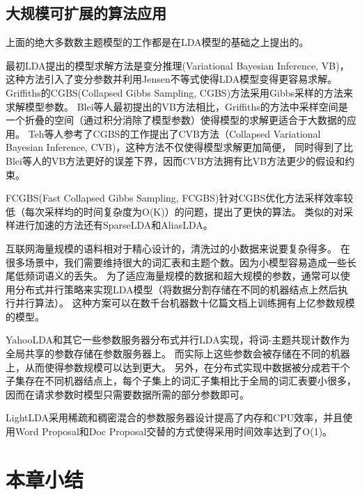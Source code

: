 \subsection{大规模可扩展的算法应用}
上面的绝大多数数主题模型的工作都是在LDA模型的基础之上提出的。

最初LDA\cite{blei2003latent}提出的模型求解方法是变分推理(Variational Bayesian Inference, VB)\cite{jordan1999an}，
这种方法引入了变分参数并利用Jensen不等式使得LDA模型变得更容易求解。
Griffiths\cite{griffiths2004finding}的CGBS(Collapsed Gibbs Sampling, CGBS)方法采用Gibbs采样的方法来求解模型参数。
Blei等人最初提出的VB方法相比，Griffiths的方法中采样空间是一个折叠的空间（通过积分消除了模型参数）使得模型的求解更适合于大数据的应用。
Teh\cite{teh2006a}等人参考了CGBS的工作提出了CVB方法（Collapsed Variational Bayesian Inference, CVB)，这种方法不仅使得模型求解更加简便，
同时得到了比Blei等人的VB方法更好的误差下界，因而CVB方法拥有比VB方法更少的假设和约束。

FCGBS(Fast Collapsed Gibbs Sampling, FCGBS)\cite{porteous2008fast}针对CGBS优化方法采样效率较低（每次采样均的时间复杂度为O(K)）的问题，提出了更快的算法。
类似的对采样进行加速的方法还有SparseLDA\cite{yao2009efficient}和AliasLDA\cite{li2014reducing}。

互联网海量规模的语料相对于精心设计的，清洗过的小数据来说要复杂得多。
在很多场景中，我们需要维持很大的词汇表和主题个数。因为小模型容易造成一些长尾低频词语义的丢失。
为了适应海量规模的数据和超大规模的参数，通常可以使用分布式并行策略来实现LDA模型（将数据分割存储在不同的机器结点上然后执行并行算法）。
这种方案可以在数千台机器数十亿篇文档上训练拥有上亿参数规模的模型\cite{Liu:2011:PPL:1961189.1961198, Peacock, ahmed2012scalable, li2014scaling, yuan2015lightlda}。 

YahooLDA\cite{ahmed2012scalable}和其它一些参数服务器分布式并行LDA实现\cite{li2014scaling}，将词-主题共现计数作为全局共享的参数存储在参数服务器上。
而实际上这些参数会被存储在不同的机器上，从而使得参数规模可以达到更大。
另外，在分布式实现中数据被分成若干个子集存在不同机器结点上，每个子集上的词汇子集相比于全局的词汇表要小很多，因而在请求参数时模型只需要数据所需的部分参数即可。

LightLDA\cite{yuan2015lightlda}采用稀疏和稠密混合的参数服务器设计提高了内存和CPU效率，并且使用Word Proposal和Doc Proposal交替的方式使得采用时间效率达到了O(1)。

\section{本章小结}

